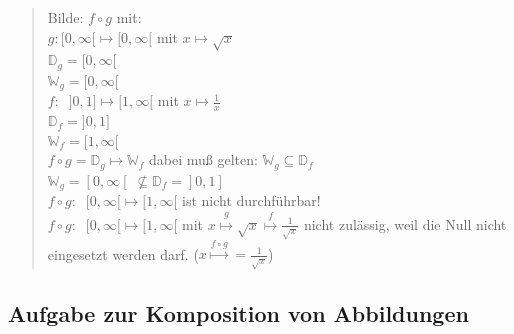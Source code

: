 \begin{quote}
	Bilde: $f\circ g$ mit:\\
	$g:[0,\infty[ \longmapsto [0,\infty[$ mit $x\longmapsto\sqrt{x}$\\
	$\mathbb{D}_g=[0,\infty[$\\
	$\mathbb{W}_g=[0,\infty[$\vspace*{2mm}\\
	$f:\;\;]0,1] \longmapsto [1,\infty[$ mit $x\longmapsto\frac{1}{x}$\\
	$\mathbb{D}_f=]0,1]$\\
	$\mathbb{W}_f=[1,\infty[$\vspace*{2mm}\\
	$f\circ g=\mathbb{D}_g\longmapsto\mathbb{W}_f$ dabei muß gelten: $\mathbb{W}_g\subseteq\mathbb{D}_f$\\
	$\mathbb{W}_g=[0,\infty[\;\nsubseteq\mathbb{D}_f=]0,1]$\\
	$f\circ g:\;\;[0,\infty[ \longmapsto [1,\infty[$ ist nicht durchführbar!\\
	$f\circ g:\;\;[0,\infty[\longmapsto [1,\infty[$ mit $x\overset{g}{\longmapsto}\sqrt{x}\overset{f}{\longmapsto} \frac{1}{\sqrt{x}}$ nicht zulässig, weil die Null nicht eingesetzt werden darf. ($x\overset{f\circ g}{\longmapsto}=\frac{1}{\sqrt{x}}$)\\
\end{quote}
\subsection{Aufgabe zur Komposition von Abbildungen}

